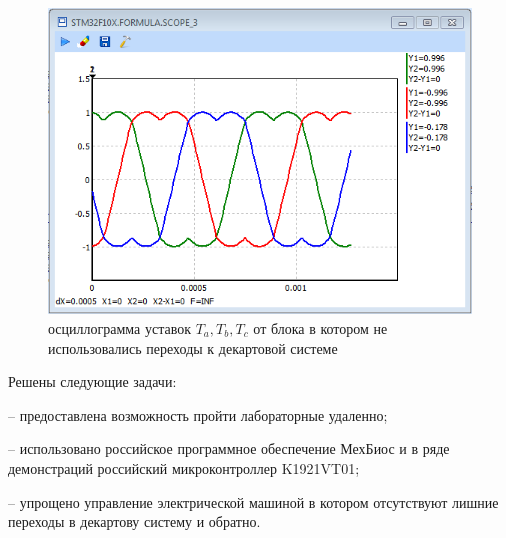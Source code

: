\documentclass[a4paper]{article}
\begin{document}
\begin{figure}[!ht]
\centering
	\includegraphics[scale=0.37]{8871_scope}
	\caption{осциллограмма уставок $T_a, T_b, T_c$ от блока в котором не использовались переходы к декартовой системе}
	\label{our_scope}
\end{figure}

%


Решены следующие задачи:

-- предоставлена возможность пройти лабораторные удаленно;

-- использовано российское программное обеспечение МехБиос и в ряде демонстраций российский микроконтроллер K1921VT01;

-- упрощено управление электрической машиной в котором отсутствуют лишние переходы в декартову систему и обратно.
\end{document}
